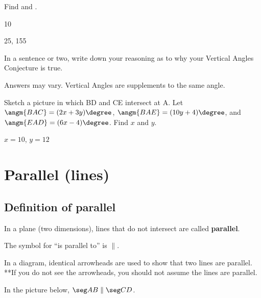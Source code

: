 \begin{exercises}
\begin{ex}
\begin{exparts}
		\item Find  and .
		\medskip
	\end{exparts}
\begin{sol}
\hspace*{\fill}
\begin{exparts}
\item 10
\item 25, 155
\end{exparts}
\end{sol}
\end{ex}

\begin{ex}
In a sentence or two, write down your reasoning as to why your Vertical Angles Conjecture is true.
\begin{sol} Answers may vary.  Vertical Angles are supplements to the same angle. \end{sol}
\end{ex}

\medskip

\begin{ex}
Sketch a picture in which \seg BD and \seg CE intersect at \pnt A. 
Let $\angm{BAC}=(2x+3y)\degree$,
$\angm{BAE}=(10y+4)\degree$,
and $\angm{EAD}=(6x-4)\degree$.
Find $x$ and $y$.
\begin{sol}
$x=10$, $y=12$
\end{sol}
\end{ex}

\vspace{6cm}

\end{exercises}
\newpage


\section{Parallel (lines)}
\subsection{Definition of parallel}
In a plane (two dimensions), lines that do not intersect are called \textbf{parallel}.

The symbol for ``is parallel to'' is $\parallel$.

In a diagram, identical arrowheads are used to show that two lines are parallel.\\ 
**If you do not see the arrowheads, you should not assume the lines are parallel.

In the picture below, $\seg AB\parallel\seg CD$.

